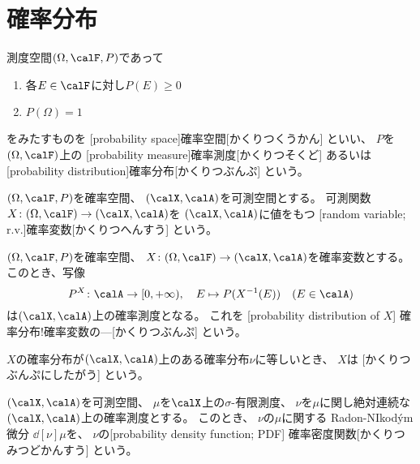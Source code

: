 \documentclass[report]{jlreq}
\begin{document}
%
\section{確率分布}

\begin{definition}[確率空間]
    測度空間$(\Omega, \calF, P)$であって
    \begin{enumerate}
        \item 各$E \in \calF$に対し$P(E) \ge 0$
        \item $P(\Omega) = 1$
    \end{enumerate}
    をみたすものを
    [probability space]{確率空間}[かくりつくうかん]
    といい、
    $P$を$(\Omega, \calF)$上の
    [probability measure]{確率測度}[かくりつそくど]
    あるいは
    [probability distribution]{確率分布}[かくりつぶんぷ]
    という。
\end{definition}

\begin{definition}[確率変数]
    $(\Omega, \calF, P)$を確率空間、
    $(\calX, \calA)$を可測空間とする。
    可測関数$X \colon (\Omega, \calF) \to (\calX, \calA)$を
    $(\calX, \calA)$に値をもつ
    [random variable; r.v.]{確率変数}[かくりつへんすう]
    という。
\end{definition}

\begin{definition}[確率変数の確率分布]
    $(\Omega, \calF, P)$を確率空間、
    $X \colon (\Omega, \calF) \to (\calX, \calA)$を確率変数とする。
    このとき、写像
    \begin{equation}
        P^X \colon \calA \to [0, +\infty),
            \quad
            E \mapsto P(X^{-1}(E))
            \quad
            (E \in \calA)
    \end{equation}
    は$(\calX, \calA)$上の確率測度となる。
    これを
    [probability distribution of $X$]
        {確率分布!確率変数の---}[かくりつぶんぷ]
    という。

    $X$の確率分布が$(\calX, \calA)$上のある確率分布$\nu$に等しいとき、
    $X$は
    [かくりつぶんぷにしたがう]
    という。
\end{definition}

\begin{definition}[確率密度関数]
    $(\calX, \calA)$を可測空間、
    $\mu$を$\calX$上の$\sigma$-有限測度、
    $\nu$を$\mu$に関し絶対連続な$(\calX, \calA)$上の確率測度とする。
    このとき、
    $\nu$の$\mu$に関する Radon-NIkod\'ym 微分
    $\dd[\nu]{\mu}$を、
    $\nu$の[probability density function; PDF]
        {確率密度関数}[かくりつみつどかんすう]
    という。
\end{definition}
\end{document}

